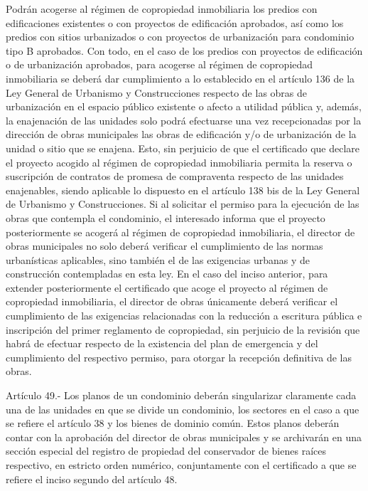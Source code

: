     Podrán acogerse al régimen de copropiedad inmobiliaria los predios con edificaciones existentes o con proyectos de edificación aprobados, así como los predios con sitios urbanizados o con proyectos de urbanización para condominio tipo B aprobados. Con todo, en el caso de los predios con proyectos de edificación o de urbanización aprobados, para acogerse al régimen de copropiedad inmobiliaria se deberá dar cumplimiento a lo establecido en el artículo 136 de la Ley General de Urbanismo y Construcciones respecto de las obras de urbanización en el espacio público existente o afecto a utilidad pública y, además, la enajenación de las unidades solo podrá efectuarse una vez recepcionadas por la dirección de obras municipales las obras de edificación y/o de urbanización de la unidad o sitio que se enajena. Esto, sin perjuicio de que el certificado que declare el proyecto acogido al régimen de copropiedad inmobiliaria permita la reserva o suscripción de contratos de promesa de compraventa respecto de las unidades enajenables, siendo aplicable lo dispuesto en el artículo 138 bis de la Ley General de Urbanismo y Construcciones.
    Si al solicitar el permiso para la ejecución de las obras que contempla el condominio, el interesado informa que el proyecto posteriormente se acogerá al régimen de copropiedad inmobiliaria, el director de obras municipales no solo deberá verificar el cumplimiento de las normas urbanísticas aplicables, sino también el de las exigencias urbanas y de construcción contempladas en esta ley.
    En el caso del inciso anterior, para extender posteriormente el certificado que acoge el proyecto al régimen de copropiedad inmobiliaria, el director de obras únicamente deberá verificar el cumplimiento de las exigencias relacionadas con la reducción a escritura pública e inscripción del primer reglamento de copropiedad, sin perjuicio de la revisión que habrá de efectuar respecto de la existencia del plan de emergencia y del cumplimiento del respectivo permiso, para otorgar la recepción definitiva de las obras.
   
    Artículo 49.- Los planos de un condominio deberán singularizar claramente cada una de las unidades en que se divide un condominio, los sectores en el caso a que se refiere el artículo 38 y los bienes de dominio común. Estos planos deberán contar con la aprobación del director de obras municipales y se archivarán en una sección especial del registro de propiedad del conservador de bienes raíces respectivo, en estricto orden numérico, conjuntamente con el certificado a que se refiere el inciso segundo del artículo 48.
   
